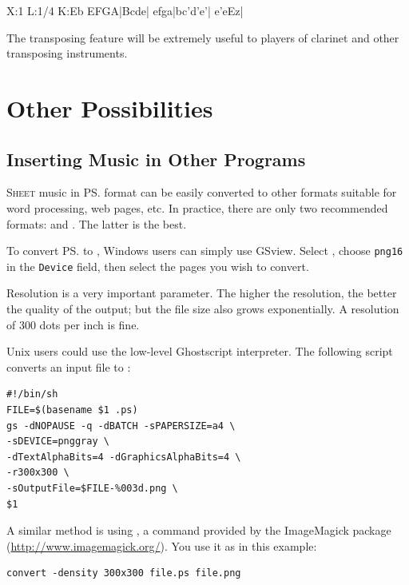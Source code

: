 \documentclass[a4paper,fullpage,12pt]{book}
\begin{document}
\begin{abcsource}
X:1
L:1/4
K:Eb
%
EFGA|Bcde|
efga|bc'd'e'|
e'eEz|
\end{abcsource}

The transposing feature will be extremely useful to players of
clarinet and other transposing instruments.


\noteseparator


\chapter{Other Possibilities}


\section{Inserting Music in Other Programs}
\label{sec:word}

\lettrine{S}{heet} music in \ps{} format can be easily converted to
other formats suitable for word processing, web pages, etc. In
practice, there are only two recommended formats:  and
. The latter is the best.

To convert \ps{} to , Windows users can simply use GSview.
Select , choose \texttt{png16} in the
\texttt{Device} field, then select the pages you wish to convert.

Resolution is a very important parameter. The higher the resolution,
the better the quality of the output; but the file size also grows
exponentially. A resolution of 300 dots per inch is fine.

Unix users could use the low-level Ghostscript interpreter. The
following script converts an input file to :

\begin{verbatim}
#!/bin/sh
FILE=$(basename $1 .ps)
gs -dNOPAUSE -q -dBATCH -sPAPERSIZE=a4 \
-sDEVICE=pnggray \
-dTextAlphaBits=4 -dGraphicsAlphaBits=4 \
-r300x300 \
-sOutputFile=$FILE-%003d.png \
$1
\end{verbatim}

A similar method is using , a command provided by the
ImageMagick package (\url{http://www.imagemagick.org/}). You use it as
in this example:

\begin{verbatim}
convert -density 300x300 file.ps file.png
\end{verbatim}
\end{document}
